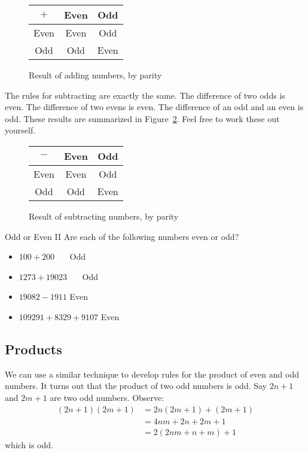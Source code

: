 \documentclass[a4paper,10pt]{report}
\begin{document}
\begin{figure}
 \begin{tabular}{c|cc}
  \(+\) & Even & Odd  \\
  \hline
  Even   & Even & Odd \\
  Odd    & Odd & Even
 \end{tabular}

 \caption{Result of adding numbers, by parity}
 \label{pd:psumt}
\end{figure}

The rules for subtracting are exactly the same. The difference of two odds is
even. The difference of two evens is even. The difference of an odd and an even
is odd. These results are summarized in Figure~\ref{pd:pdifft}. Feel free to
work these out yourself.

\begin{figure}
 \begin{tabular}{c|cc}
  \(-\) & Even & Odd  \\
  \hline
  Even   & Even & Odd \\
  Odd    & Odd & Even
 \end{tabular}

 \caption{Result of subtracting numbers, by parity}
 \label{pd:pdifft}
\end{figure}

\begin{problem}{Odd or Even II}
 Are each of the following numbers even or odd?

 \begin{itemize}
  \item \(100 + 200\) \hfill {}~~~Odd
  \item \(1273 + 19023\) \hfill {}~~~Odd
  \item \(19082 - 1911\) \hfill Even~~~
  \item \(109291 + 8329 + 9107\) \hfill Even~~~
 \end{itemize}
\end{problem}

\subsection{Products}

We can use a similar technique to develop rules for the product of even and odd
numbers. It turns out that the product of two odd numbers is odd. Say \(2n+1\)
and \(2m+1\) are two odd numbers. Observe: \begin{align*}
 (2n+1)(2m+1)
 &= 2n(2m+1) + (2m+1) \\
 &= 4nm+2n+2m+1 \\
 &= 2(2nm+n+m) + 1
\end{align*} which is odd.
\end{document}
